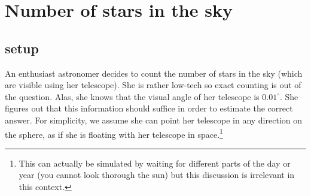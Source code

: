 \documentclass{article}
\begin{document}




\section{Number of stars in the sky}
\subsection*{setup}
An enthusiast astronomer decides to count the number of stars in the sky (which are visible using her telescope).
She is rather low-tech so exact counting is out of the question. Alas, she knows that the visual angle of her telescope is $0.01^{\circ}$.
She figures out that this information should suffice in order to estimate the correct answer.
For simplicity, we assume she can point her telescope in any direction on the sphere, as if she is floating with her telescope in space.\footnote{This 
can actually be simulated by waiting for different parts of the day or year (you cannot look thorough the sun) but this discussion is irrelevant in this context.}
\end{document}
